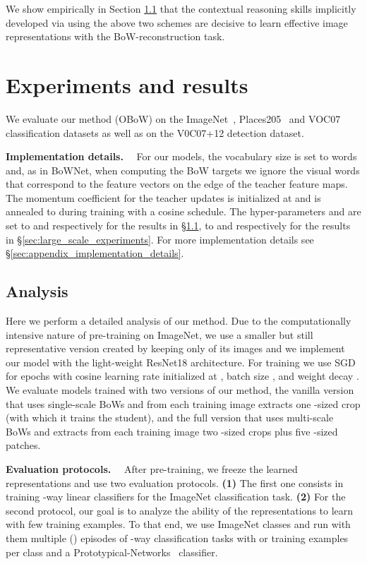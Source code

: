 \documentclass[final]{cvpr}
\newcommand{\parag}[1]{\smallskip\noindent\textbf{#1}~~}
\begin{document}
We show empirically in Section \ref{sec:method_analysis} that the contextual reasoning skills implicitly developed via using the above two schemes are decisive to learn effective image representations with the BoW-reconstruction task. \section{Experiments and results}

We evaluate our method (OBoW) on the ImageNet~\cite{russakovsky2015imagenet}, Places205~\cite{NIPS2014_5349} and VOC07~\cite{Everingham10} classification datasets as well as on the V0C07+12 detection dataset. 

\parag{Implementation details.}
For our models, the vocabulary size is set to  words and, as in BoWNet, when computing the BoW targets we ignore the visual words that correspond to the feature vectors on the edge of the teacher feature maps.
The momentum coefficient  for the teacher updates is initialized at  and is annealed to  during training with a cosine schedule.
The hyper-parameters  and  are set to  and  respectively for the results in \S\ref{sec:method_analysis}, to  and  respectively for the results in \S\ref{sec:large_scale_experiments}.
For more implementation details see \S\ref{sec:appendix_implementation_details}.

\subsection{Analysis} \label{sec:method_analysis}

Here we perform a detailed analysis of our method.
Due to the computationally intensive nature of pre-training on ImageNet, 
we use a smaller but still representative version created by keeping only  of its images
and we implement our model with the light-weight ResNet18 architecture.
For training we use SGD for  epochs with cosine learning rate initialized at , batch size , and weight decay .
We evaluate models trained with two versions of our method, the vanilla version that uses single-scale BoWs and from each training image extracts one -sized crop (with which it trains the student), and the full version that uses multi-scale BoWs and extracts from each training image two -sized crops plus five -sized patches.

\parag{Evaluation protocols.}
After pre-training, we freeze the learned representations and use two evaluation protocols.
\textbf{(1)} The first one consists in training -way linear classifiers for the ImageNet classification task.
\textbf{(2)} 
For the second protocol, our goal is to analyze the ability of the representations to learn with few training examples. To that end, we use  ImageNet classes and run with them multiple () episodes of -way classification tasks with  or  training examples per class and a Prototypical-Networks~\cite{snell2017prototypical} classifier.
\end{document}
